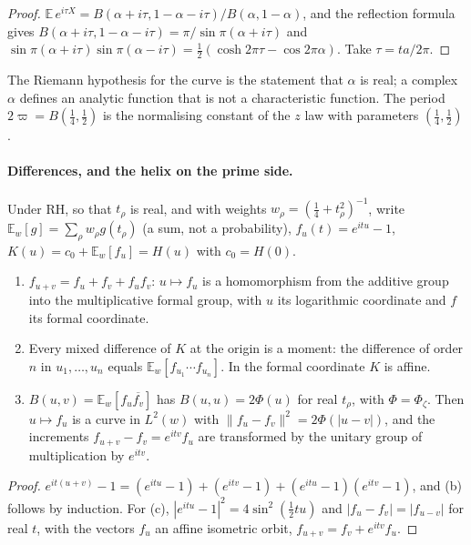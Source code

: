 \begin{proof}
$\mathbb E\,e^{i\tau X}=B(\alpha+i\tau,1-\alpha-i\tau)/B(\alpha,1-\alpha)$, and the reflection formula gives $B(\alpha+i\tau,1-\alpha-i\tau)=\pi/\sin\pi(\alpha+i\tau)$ and $\sin\pi(\alpha+i\tau)\sin\pi(\alpha-i\tau)=\frac12(\cosh2\pi\tau-\cos2\pi\alpha)$. Take $\tau=ta/2\pi$.
\end{proof}

The Riemann hypothesis for the curve is the statement that $\alpha$ is real; a complex $\alpha$ defines an analytic function that is not a characteristic function. The period $2\varpi=B(\frac14,\frac12)$ is the normalising constant of the $z$ law with parameters $(\frac14,\frac12)$.

\paragraph{Differences, and the helix on the prime side.} Under RH, so that $t_\rho$ is real, and with weights $w_\rho=(\frac14+t_\rho^2)^{-1}$, write $\mathbb E_w[g]=\sum_\rho w_\rho g(t_\rho)$ (a sum, not a probability), $f_u(t)=e^{itu}-1$, $K(u)=c_0+\mathbb E_w[f_u]=H(u)$ with $c_0=H(0)$.

\begin{proposition}[Differences of $K$]\label{mql:prop:differences}
\begin{enumerate}
\item $f_{u+v}=f_u+f_v+f_uf_v$: $u\mapsto f_u$ is a homomorphism from the additive group into the multiplicative formal group, with $u$ its logarithmic coordinate and $f$ its formal coordinate.
\item Every mixed difference of $K$ at the origin is a moment: the difference of order $n$ in $u_1,\dots,u_n$ equals $\mathbb E_w[f_{u_1}\cdots f_{u_n}]$. In the formal coordinate $K$ is affine.
\item $B(u,v)=\mathbb E_w[f_u\overline{f_v}]$ has $B(u,u)=2\Phi(u)$ for real $t_\rho$, with $\Phi=\Phi_\zeta$. Then $u\mapsto f_u$ is a curve in $L^2(w)$ with $\|f_u-f_v\|^2=2\Phi(|u-v|)$, and the increments $f_{u+v}-f_v=e^{itv}f_u$ are transformed by the unitary group of multiplication by $e^{itv}$.
\end{enumerate}
\end{proposition}

\begin{proof}
$e^{it(u+v)}-1=(e^{itu}-1)+(e^{itv}-1)+(e^{itu}-1)(e^{itv}-1)$, and (b) follows by induction. For (c), $|e^{itu}-1|^2=4\sin^2(\frac12tu)$ and $|f_u-f_v|=|f_{u-v}|$ for real $t$, with the vectors $f_u$ an affine isometric orbit, $f_{u+v}=f_v+e^{itv}f_u$.
\end{proof}

